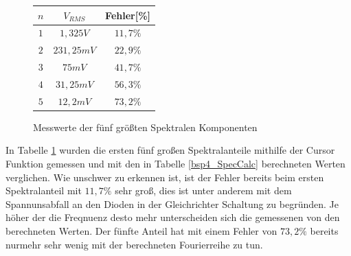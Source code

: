 \begin{figure}[H]
  \begin{center}
    \begin{tabular}{|c|c|c|} \hline
    $n$ & $V_{RMS}$ & Fehler[\%] \\ \hline
    $1$ & $1,325V$    & $11,7\%$\\ \hline
    $2$ & $231,25mV$  & $22,9\%$\\ \hline
    $3$ & $75mV$      & $41,7\%$\\ \hline
    $4$ & $31,25mV$   & $56,3\%$\\ \hline
    $5$ & $12,2mV$    & $73,2\%$\\ \hline
    \end{tabular}
  \end{center}
  \caption{Messwerte der f\"unf gr\"o\ss{}ten Spektralen Komponenten} \label{bsp4_SpecMess}
\end{figure}
\noindent
In Tabelle \ref{bsp4_SpecMess} wurden die ersten f\"unf gro\ss{}en Spektralanteile mithilfe der Cursor Funktion gemessen und mit den in Tabelle \ref{bsp4_SpecCalc} berechneten Werten verglichen. Wie unschwer zu erkennen ist, ist der Fehler bereits beim ersten Spektralanteil mit $11,7\%$ sehr gro\ss{}, dies ist unter anderem mit dem Spannunsabfall an den Dioden in der Gleichrichter Schaltung zu begr\"unden. Je h\"oher der die Freqnuenz desto mehr unterscheiden sich die gemessenen von den berechneten Werten. Der f\"unfte Anteil hat mit einem Fehler von $73,2\%$ bereits nurmehr sehr wenig mit der berechneten Fourierreihe zu tun. 
